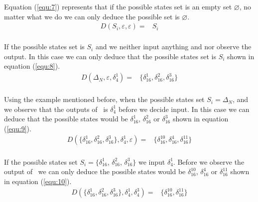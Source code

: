 Equation (\ref{equ:7}) represents that if the possible states set is an empty set $\varnothing$, no matter what we do we can only deduce the possible set is $\varnothing$. 
\begin{equation}
\begin{split}
D\left(S_i,\varepsilon,\varepsilon\right)=&S_i\\
\end{split}
\label{equ:8}
\end{equation}

If the possible states set is $S_i$ and we neither input anything and nor observe the output. In this case we can only deduce that the possible states set is $S_i$ shown in equation (\ref{equ:8}).
\begin{equation}
\begin{split}
D\left(\Delta_N,\varepsilon,\delta_4^1\right)=&\{\delta_{16}^1,\delta_{16}^2,\delta_{16}^3\}\\
\end{split}
\label{equ:9}
\end{equation}
 
 Using the example mentioned before, when the possible states set $S_i=\Delta_N$, and  we observe that the outputs of \BCN\ is $\delta_4^1$ before we decide input. In this case we can deduce that the possible states would be $\delta_{16}^1$, $\delta_{16}^2$ or  $\delta_{16}^3$ shown in equation (\ref{equ:9}).
\begin{equation}
\begin{split}
D\left(\{\delta_{16}^1,\delta_{16}^2,\delta_{16}^3\},\delta_4^1,\varepsilon\right)=&\{\delta_{16}^{10},\delta_{16}^4,\delta_{16}^{11}\}\\
\end{split}
\label{equ:10}
\end{equation}

If the possible states set $S_i=\{\delta_{16}^1$, $\delta_{16}^2$, $\delta_{16}^3\}$ we input $\delta_4^1$. Before we observe the output of \BCN\ we can only deduce the possible states would be   $\delta_{16}^{10}$, $\delta_{16}^4$ or  $\delta_{16}^{11}$ shown in equation (\ref{equ:10}).
\begin{equation}
\begin{split}
D\left(\{\delta_{16}^1,\delta_{16}^2,\delta_{16}^3\},\delta_4^1,\delta_4^3\right)=&\{\delta_{16}^{10},\delta_{16}^{11}\}\\
\end{split}
\label{equ:11}
\end{equation}

